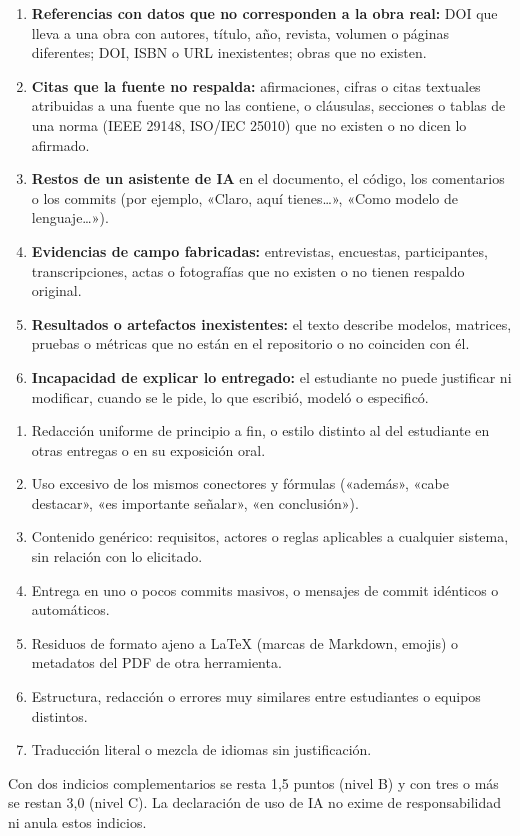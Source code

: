 \documentclass[11pt]{article}
\begin{document}
\begin{cajapiso}[title={Indicios graves de uso de IA: cada uno, por sí solo, implica CERO (P4)}]
	\begin{enumerate}[label=\textbf{G\arabic*.},leftmargin=24pt,itemsep=3pt]
		\item \textbf{Referencias con datos que no corresponden a la obra real:} DOI que lleva a una obra con autores, título, año, revista, volumen o páginas diferentes; DOI, ISBN o URL inexistentes; obras que no existen.
		\item \textbf{Citas que la fuente no respalda:} afirmaciones, cifras o citas textuales atribuidas a una fuente que no las contiene, o cláusulas, secciones o tablas de una norma (IEEE 29148, ISO/\allowbreak{}IEC 25010) que no existen o no dicen lo afirmado.
		\item \textbf{Restos de un asistente de IA} en el documento, el código, los comentarios o los commits (por ejemplo, «Claro, aquí tienes\ldots», «Como modelo de lenguaje\ldots»).
		\item \textbf{Evidencias de campo fabricadas:} entrevistas, encuestas, participantes, transcripciones, actas o fotografías que no existen o no tienen respaldo original.
		\item \textbf{Resultados o artefactos inexistentes:} el texto describe modelos, matrices, pruebas o métricas que no están en el repositorio o no coinciden con él.
		\item \textbf{Incapacidad de explicar lo entregado:} el estudiante no puede justificar ni modificar, cuando se le pide, lo que escribió, modeló o especificó.
	\end{enumerate}
\end{cajapiso}

\begin{cajaaviso}[title={Indicios complementarios (se acumulan)}]
	\begin{enumerate}[label=\textbf{I\arabic*.},leftmargin=24pt,itemsep=3pt]
		\item Redacción uniforme de principio a fin, o estilo distinto al del estudiante en otras entregas o en su exposición oral.
		\item Uso excesivo de los mismos conectores y fórmulas («además», «cabe destacar», «es importante señalar», «en conclusión»).
		\item Contenido genérico: requisitos, actores o reglas aplicables a cualquier sistema, sin relación con lo elicitado.
		\item Entrega en uno o pocos commits masivos, o mensajes de commit idénticos o automáticos.
		\item Residuos de formato ajeno a \LaTeX{} (marcas de Markdown, emojis) o metadatos del PDF de otra herramienta.
		\item Estructura, redacción o errores muy similares entre estudiantes o equipos distintos.
		\item Traducción literal o mezcla de idiomas sin justificación.
	\end{enumerate}
	Con dos indicios complementarios se resta 1,5 puntos (nivel B) y con tres o más se restan 3,0 (nivel C). La declaración de uso de IA no exime de responsabilidad ni anula estos indicios.
\end{cajaaviso}
\end{document}
